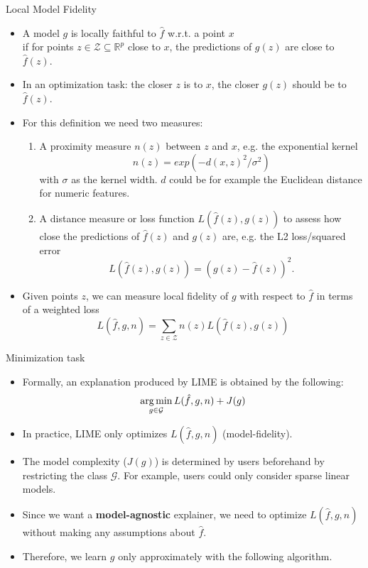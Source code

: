\documentclass[aspectratio=169]{../latex_main/tntbeamer}  %
\begin{document}
\begin{frame}{Local Model Fidelity}
\vspace{-2em}
 		\begin{itemize}
 			\item A model $g$ is locally faithful to $\hat{f}$ w.r.t. a point $x$\\ if for points $z \in \mathcal{Z} \subseteq \mathbb{R}^p$ close to $x$, the predictions of $g(z)$ are close to $\hat{f}(z)$. 
 			\pause
 			 \item In an optimization task: the closer $z$ is to $x$, the closer $g(z)$ should be to $\hat{f}(z)$.  
 			 \pause
 			\item For this definition we need two measures:
 			\begin{enumerate}
 				\item A proximity measure $n(z)$ between $z$ and $x$, e.g. the exponential kernel
 				$$n(z) = exp(-d(x, z)^2/\sigma^2)$$ 
 				with $\sigma$ as the kernel width. $d$ could be for example the Euclidean distance for numeric features. 
 				\pause
 				\item A distance measure or loss function $L(\hat{f}(z), g(z))$ to assess how close the predictions of $\hat{f}(z)$ and $g(z)$ are, e.g. the L2 loss/squared error $$L(\hat{f}(z), g(z)) = (g(z) - \hat{f}(z))^2.$$ 
 			\end{enumerate}
 			\pause
 			\item Given points $z$, we can measure local fidelity of $g$ with respect to $\hat{f}$ in terms of a weighted loss
 			\begin{equation}
 				L(\hat{f}, g, n) = \sum_{z \in \mathcal{Z}} n(z) L(\hat{f}(z), g(z))
 				\label{eq:optim}
 			\end{equation}
 		\end{itemize}
\end{frame}
\begin{frame}{Minimization task}
	\begin{itemize}
		\item Formally, an explanation produced by LIME is obtained by the following: 
		$$ \operatorname*{arg\,min}_{g \in \mathcal{G}} L(\hat{f}, g, n) + J(g)$$
		\item In practice, LIME only optimizes $L(\hat{f}, g, n)$ (model-fidelity). 	
		\item The model complexity ($J(g)$) is determined by users beforehand by restricting the class $\mathcal{G}$. For example, users could only consider sparse linear models. 
		\item Since we want a \textbf{model-agnostic} explainer, we need to optimize $L(\hat{f}, g, n)$ without making any assumptions about $\hat{f}$. 
		\item Therefore, we learn $g$ only approximately with the following algorithm.  
		\end{itemize}
\end{frame} 
\end{document}
